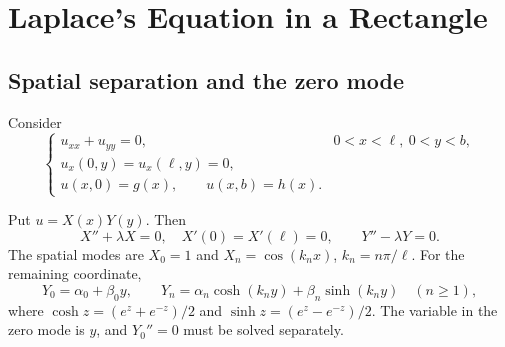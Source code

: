 \documentclass[11pt,a4paper]{article}
\begin{document}
\section{Laplace's Equation in a Rectangle}
\subsection{Spatial separation and the zero mode}
Consider
\begin{equation}
 \begin{cases}
 u_{xx}+u_{yy}=0,&0<x<\ell,\ 0<y<b,\\
 u_x(0,y)=u_x(\ell,y)=0,\\
 u(x,0)=g(x),\qquad u(x,b)=h(x).
 \end{cases}
\end{equation}
\begin{center}
\end{center}
Put $u=X(x)Y(y)$. Then
\begin{equation}
 X''+\lambda X=0,\quad X'(0)=X'(\ell)=0,\qquad Y''-\lambda Y=0.
\end{equation}
The spatial modes are $X_0=1$ and $X_n=\cos(k_nx)$, $k_n=n\pi/\ell$.
For the remaining coordinate,
\begin{equation}
 Y_0=\alpha_0+\beta_0y,\qquad
 Y_n=\alpha_n\cosh(k_ny)+\beta_n\sinh(k_ny)\quad(n\ge1),
\end{equation}
where $\cosh z=(e^z+e^{-z})/2$ and $\sinh z=(e^z-e^{-z})/2$.
The variable in the zero mode is $y$, and $Y_0''=0$ must be solved separately.
\end{document}
